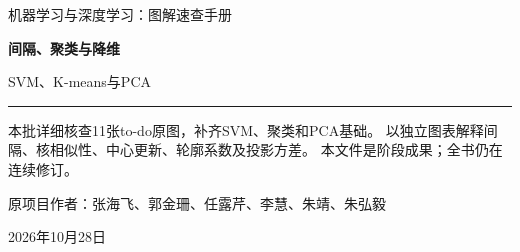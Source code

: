 \documentclass[a4paper,11pt,oneside,openany]{book}
\begin{document}
\frontmatter
\hypersetup{pageanchor=false}
\begin{titlepage}
\vspace*{16mm}
{\sffamily\color{Teal}\large 机器学习与深度学习：图解速查手册\par}
\vspace{15mm}
{\sffamily\bfseries\color{Ink}\Huge 间隔、聚类与降维\par}
\vspace{6mm}
{\sffamily\color{Ink}\LARGE SVM、K-means与PCA\par}
\vspace{12mm}
\noindent\textcolor{Teal}{\rule{\textwidth}{1.2pt}}
\vspace{7mm}
\begin{keyidea}[第九批阶段样章]
本批详细核查11张to-do原图，补齐SVM、聚类和PCA基础。
以独立图表解释间隔、核相似性、中心更新、轮廓系数及投影方差。
本文件是阶段成果；全书仍在连续修订。
\end{keyidea}
\vfill
原项目作者：张海飞、郭金珊、任露芹、李慧、朱靖、朱弘毅\par
\vspace{4mm}
2026年10月28日\par
\end{titlepage}
\hypersetup{pageanchor=true}
\tableofcontents
\mainmatter
\setcounter{chapter}{8}


\end{document}

